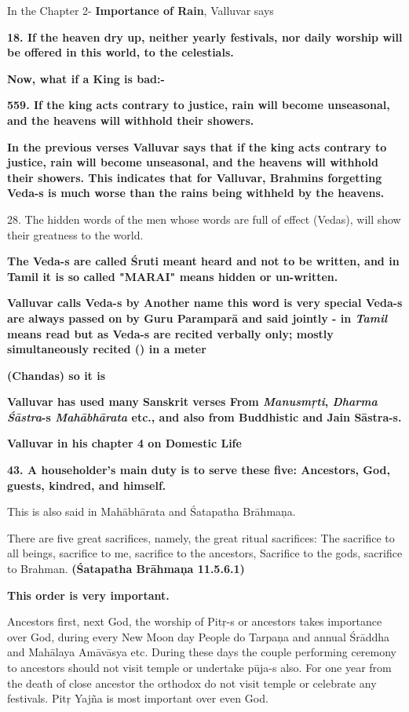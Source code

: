 In the Chapter 2- \textbf{Importance of Rain}, Valluvar says

\textbf{18. If the heaven dry up, neither yearly festivals, nor daily worship will be offered in this world, to the celestials.}

\textbf{Now, what if a King is bad:-}

\textbf{559.\supskpt{\endnote{}} If the king acts contrary to justice, rain will become unseasonal, and the heavens will withhold their showers.}

\textbf{In the previous verses Valluvar says that if the king acts contrary to justice, rain will become unseasonal, and the heavens will withhold their showers. This indicates that for Valluvar, Brahmins forgetting Veda-s is much worse than the rains being withheld by the heavens.}

\endnote{} 28. The hidden words of the men whose words are full of effect (Vedas), will show their greatness to the world.

\textbf{The Veda-s are called Śruti meant heard and not to be written, and in Tamil it is so called "MARAI" means hidden or un-written.}

\textbf{Valluvar calls Veda-s by Another name  this word is very special Veda-s are always passed on by Guru Paramparā and said jointly - in \textit{Tamil}  means read but as Veda-s are recited verbally only; mostly simultaneously recited () in a meter}

\textbf{(Chandas) so it is }

\textbf{Valluvar has used many Sanskrit verses From \textit{Manusmŗti}, \textit{Dharma Śāstra}-s \textit{Mahābhārata} etc., and also from Buddhistic and Jain Sāstra-s.}

\textbf{Valluvar in his chapter 4 on Domestic Life}

\textbf{43. \supskpt{\endnote{}}A householder's main duty is to serve these five: Ancestors, God, guests, kindred, and himself.}

This is also said in Mahābhārata and Śatapatha Brāhmaņa.

There are five great sacrifices, namely, the great ritual sacrifices: The sacrifice to all beings, sacrifice to me, sacrifice to the ancestors, Sacrifice to the gods, sacrifice to Brahman. \textbf{(Śatapatha Brāhmaņa 11.5.6.1)}

\textbf{This order is very important.}

Ancestors first, next God, the worship of Pitŗ-s or ancestors takes importance over God, during every New Moon day People do Tarpaņa and annual Śrāddha and Mahālaya Amāvāsya etc. During these days the couple performing ceremony to ancestors should not visit temple or undertake pūja-s also. For one year from the death of close ancestor the orthodox do not visit temple or celebrate any festivals. Pitŗ Yajña is most important over even God.


